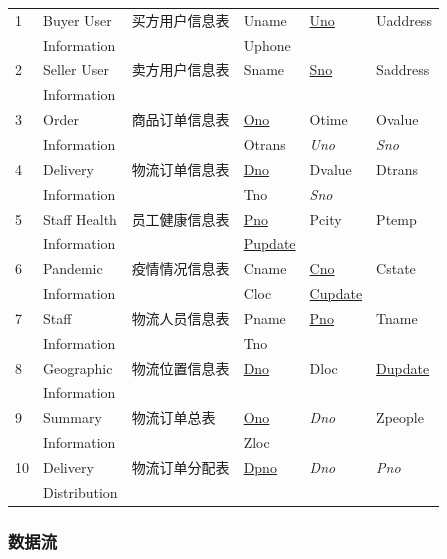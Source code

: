 \documentclass[12pt]{article}
\begin{document}
\begin{center}
\begin{supertabular}{llllll}
1 &	Buyer User &	买方用户信息表 & Uname &	\underline{Uno} &	Uaddress  \\ & Information &&	Uphone && \\
2 &	Seller User &	卖方用户信息表 & Sname &	\underline{Sno} &	Saddress \\ & Information &&&& \\
3 &	Order  & 商品订单信息表 &	\underline{Ono} &	Otime &	Ovalue  \\
& Information &&	Otrans & \textit{Uno} &	\textit{Sno}  \\
4 &	Delivery &	物流订单信息表 &	\underline{Dno} &	Dvalue &	Dtrans  \\ & Information && Tno &	\textit{Sno} & \\
5 &	Staff Health &	员工健康信息表 &	\underline{Pno} &	Pcity & Ptemp \\ 
& Information && \underline{Pupdate} && \\
6 &	Pandemic &	疫情情况信息表 &	Cname &	\underline{Cno} &	Cstate \\	& Information &&  Cloc & \underline{Cupdate}	& \\
7 &Staff  &	物流人员信息表 &	Pname &	\underline{Pno} &	Tname \\ & Information	& & Tno && \\
8 &	Geographic  &	物流位置信息表 &	\underline{Dno} &	Dloc &	\underline{Dupdate} \\& Information&&&& \\
9 & Summary & 物流订单总表 & \underline{Ono} & \textit{Dno} & Zpeople \\ & Information && Zloc && \\
10 & Delivery & 物流订单分配表 & \underline{Dpno} & \textit{Dno} & \textit{Pno}\\ & Distribution &&&& \\
\end{supertabular}
\end{center}

\subsubsection{数据流}

\tabletail{\bottomrule}
\end{document}
